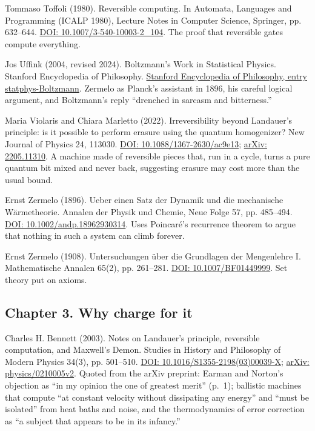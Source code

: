 \documentclass[11pt,twoside]{article}
\theoremstyle{thielethm}
\theoremstyle{thieledef}
\theoremstyle{thieledef}
\theoremstyle{thieledef}
\theoremstyle{thielethm}
\theoremstyle{thieleobs}
\theoremstyle{thielethm}
\begin{document}
\noindent Tommaso Toffoli (1980). Reversible computing. In Automata, Languages and Programming (ICALP 1980), Lecture Notes in Computer Science, Springer, pp. 632--644. \href{https://doi.org/10.1007/3-540-10003-2_104}{DOI: 10.1007/3-540-10003-2\_104}. The proof that reversible gates compute everything.
\par\medskip

\noindent Jos Uffink (2004, revised 2024). Boltzmann's Work in Statistical Physics. Stanford Encyclopedia of Philosophy. \href{https://plato.stanford.edu/entries/statphys-Boltzmann/}{Stanford Encyclopedia of Philosophy, entry statphys-Boltzmann}. Zermelo as Planck's assistant in 1896, his careful logical argument, and Boltzmann's reply ``drenched in sarcasm and bitterness.''
\par\medskip

\noindent Maria Violaris and Chiara Marletto (2022). Irreversibility beyond Landauer's principle: is it possible to perform erasure using the quantum homogenizer? New Journal of Physics 24, 113030. \href{https://doi.org/10.1088/1367-2630/ac9e13}{DOI: 10.1088/1367-2630/ac9e13}; \href{https://arxiv.org/abs/2205.11310}{arXiv: 2205.11310}. A machine made of reversible pieces that, run in a cycle, turns a pure quantum bit mixed and never back, suggesting erasure may cost more than the usual bound.
\par\medskip

\noindent Ernst Zermelo (1896). Ueber einen Satz der Dynamik und die mechanische W\"armetheorie. Annalen der Physik und Chemie, Neue Folge 57, pp. 485--494. \href{https://doi.org/10.1002/andp.18962930314}{DOI: 10.1002/andp.18962930314}. Uses Poincar\'e's recurrence theorem to argue that nothing in such a system can climb forever.
\par\medskip

\noindent Ernst Zermelo (1908). Untersuchungen \"uber die Grundlagen der Mengenlehre I. Mathematische Annalen 65(2), pp. 261--281. \href{https://doi.org/10.1007/BF01449999}{DOI: 10.1007/BF01449999}. Set theory put on axioms.
\par\medskip

\subsection*{Chapter 3. Why charge for it}

\noindent Charles H. Bennett (2003). Notes on Landauer's principle, reversible computation, and Maxwell's Demon. Studies in History and Philosophy of Modern Physics 34(3), pp. 501--510. \href{https://doi.org/10.1016/S1355-2198(03)00039-X}{DOI: 10.1016/S1355-2198(03)00039-X}; \href{https://arxiv.org/abs/physics/0210005v2}{arXiv: physics/0210005v2}. Quoted from the arXiv preprint: Earman and Norton's objection as ``in my opinion the one of greatest merit'' (p.~1); ballistic machines that compute ``at constant velocity without dissipating any energy'' and ``must be isolated'' from heat baths and noise, and the thermodynamics of error correction as ``a subject that appears to be in its infancy.''
\par\medskip
\end{document}
